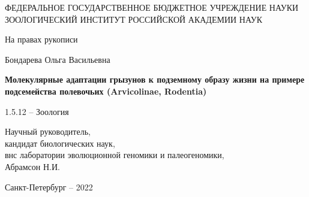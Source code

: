 \thispagestyle{empty}%
\begin{center}%
\MakeUppercase{Федеральное государственное бюджетное учреждение науки Зоологический институт Российской академии наук}
\end{center}%

\vspace{05mm}

\begin{flushright}%
	На правах рукописи
\end{flushright}%
%
\vspace{0pt plus6fill} %
\begin{center}%
{\large Бондарева Ольга Васильевна}
\end{center}%

%
\vspace{0pt plus1fill} %

\begin{center}%
\textbf{\large Молекулярные адаптации грызунов к подземному образу жизни на примере подсемейства полевочьих (Arvicolinae, Rodentia)}

\vspace{0pt plus1fill}

1.5.12 -- Зоология

\end{center}%
%
\vspace{0pt plus4fill} %

\begin{flushright}%
	
Научный руководитель,\\
кандидат биологических наук,\\
внс лаборатории эволюционной геномики и палеогеномики, \\
Абрамсон Н.И.


\end{flushright}%
%
\vspace{0pt plus4fill} %
\begin{center}%
{Санкт-Петербург -- 2022}
\end{center}%
\newpage
